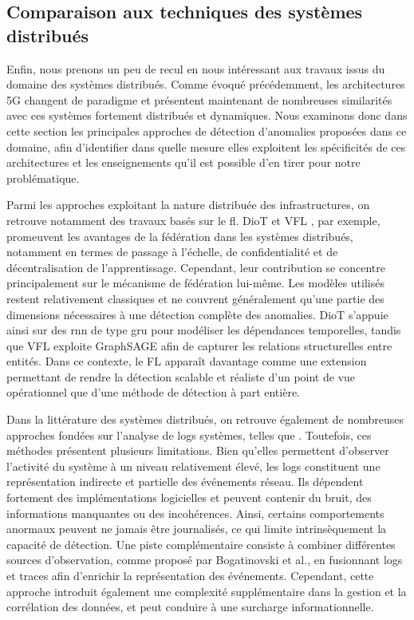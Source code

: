 \documentclass[a4paper,11pt,twoside]{StyleThese}
\begin{document}
\subsection{Comparaison aux techniques des systèmes distribués}
Enfin, nous prenons un peu de recul en nous intéressant aux travaux issus du domaine des systèmes distribués. Comme évoqué précédemment, les architectures 5G changent de paradigme et présentent maintenant de nombreuses similarités avec ces systèmes fortement distribués et dynamiques. Nous examinons donc dans cette section les principales approches de détection d’anomalies proposées dans ce domaine, afin d’identifier dans quelle mesure elles exploitent les spécificités de ces architectures et les enseignements qu’il est possible d’en tirer pour notre problématique.

Parmi les approches exploitant la nature distribuée des infrastructures, on retrouve notamment des travaux basés sur le \gls{fl}. DioT \cite{diot} et VFL \cite{vfl}, par exemple, promeuvent les avantages de la fédération dans les systèmes distribués, notamment en termes de passage à l’échelle, de confidentialité et de décentralisation de l’apprentissage. Cependant, leur contribution se concentre principalement sur le mécanisme de fédération lui-même. Les modèles utilisés restent relativement classiques et ne couvrent généralement qu’une partie des dimensions nécessaires à une détection complète des anomalies. DioT \cite{diot} s’appuie ainsi sur des \gls{rnn} de type \gls{gru} pour modéliser les dépendances temporelles, tandis que VFL \cite{vfl} exploite GraphSAGE \cite{graphsage} afin de capturer les relations structurelles entre entités. Dans ce contexte, le FL apparaît davantage comme une extension permettant de rendre la détection scalable et réaliste d’un point de vue opérationnel que d'une méthode de détection à part entière.

Dans la littérature des systèmes distribués, on retrouve également de nombreuses approches fondées sur l’analyse de logs systèmes, telles que \cite{dist_log1,dist_log2}. Toutefois, ces méthodes présentent plusieurs limitations. Bien qu’elles permettent d’observer l’activité du système à un niveau relativement élevé, les logs constituent une représentation indirecte et partielle des événements réseau. Ils dépendent fortement des implémentations logicielles et peuvent contenir du bruit, des informations manquantes ou des incohérences. Ainsi, certains comportements anormaux peuvent ne jamais être journalisés, ce qui limite intrinsèquement la capacité de détection. Une piste complémentaire consiste à combiner différentes sources d’observation, comme proposé par Bogatinovski et al.\cite{dist_log_trace}, en fusionnant logs et traces afin d’enrichir la représentation des événements. Cependant, cette approche introduit également une complexité supplémentaire dans la gestion et la corrélation des données, et peut conduire à une surcharge informationnelle. %
\end{document}
